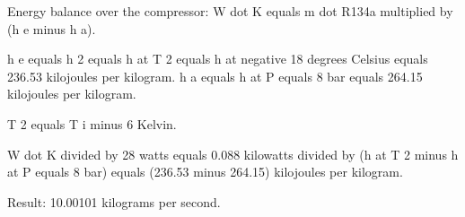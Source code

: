 Energy balance over the compressor:  
W dot K equals m dot R134a multiplied by (h e minus h a).  

h e equals h 2 equals h at T 2 equals h at negative 18 degrees Celsius equals 236.53 kilojoules per kilogram.  
h a equals h at P equals 8 bar equals 264.15 kilojoules per kilogram.  

T 2 equals T i minus 6 Kelvin.  

W dot K divided by 28 watts equals 0.088 kilowatts divided by (h at T 2 minus h at P equals 8 bar) equals (236.53 minus 264.15) kilojoules per kilogram.  

Result: 10.00101 kilograms per second.